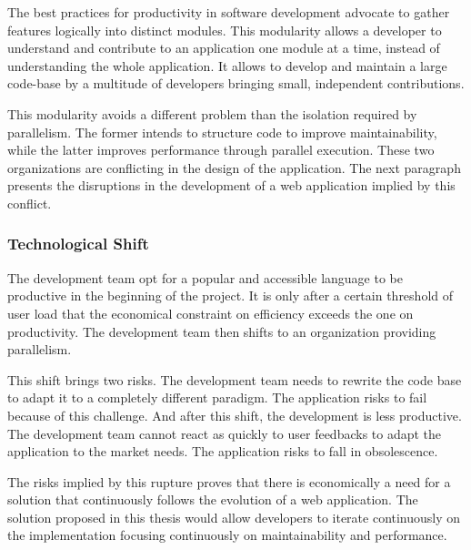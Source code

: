 The best practices for productivity in software development advocate to gather features logically into distinct modules.
This modularity allows a developer to understand and contribute to an application one module at a time, instead of understanding the whole application.
It allows to develop and maintain a large code-base by a multitude of developers bringing small, independent contributions.

This modularity avoids a different problem than the isolation required by parallelism.
The former intends to structure code to improve maintainability, while the latter improves performance through parallel execution.
These two organizations are conflicting in the design of the application.
The next paragraph presents the disruptions in the development of a web application implied by this conflict.

\subsubsection{Technological Shift}

The development team opt for a popular and accessible language to be productive in the beginning of the project. %
It is only after a certain threshold of user load that the economical constraint on efficiency exceeds the one on productivity.
The development team then shifts to an organization providing parallelism.

This shift brings two risks.
The development team needs to rewrite the code base to adapt it to a completely different paradigm.
The application risks to fail because of this challenge.
And after this shift, the development is less productive.
The development team cannot react as quickly to user feedbacks to adapt the application to the market needs.
The application risks to fall in obsolescence.

The risks implied by this rupture proves that there is economically a need for a solution that continuously follows the evolution of a web application.
The solution proposed in this thesis would allow developers to iterate continuously on the implementation focusing continuously on maintainability and performance.

